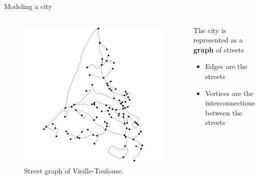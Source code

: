 \documentclass[Ligatures=TeX,table,svgnames,usetotalslideindicator,compress,10pt,aspectratio=169]{beamer}
\begin{document}
\begin{frame}{Modeling a city} 
\begin{columns}

\begin{column}{0.5\textwidth}

   \begin{figure}[!h]
        \centering
        \includegraphics[width=\textwidth]{images/path_0.png}
        \caption{Street graph of Vieille-Toulouse.}
      \end{figure}
      \end{column}
\begin{column}{0.5\textwidth}
The city is represented as a \textbf{graph} of streets
\begin{itemize}
    \item  Edges are the streets
    \item Vertices are the interconnections between the streets
    
\end{itemize}

\end{column}

\end{columns}

\end{frame}
\end{document}
